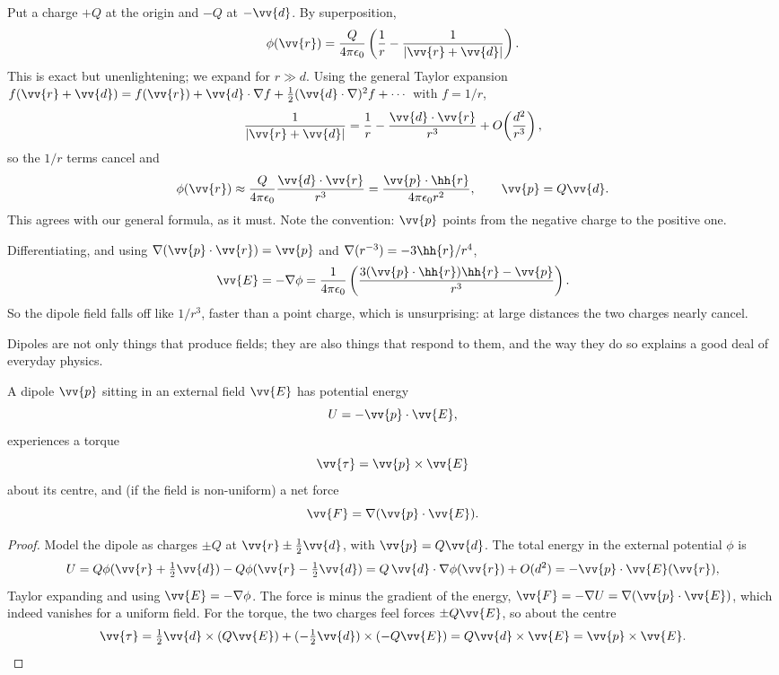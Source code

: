 \begin{example}
	Put a charge $+Q$ at the origin and $-Q$ at $-\vv{d}$. By superposition,
	$$
	\phi(\vv{r}) = \frac{Q}{4\pi\epsilon_0}\left(\frac{1}{r} - \frac{1}{|\vv{r}+\vv{d}|}\right).
	$$
	This is exact but unenlightening; we expand for $r \gg d$. Using the general Taylor expansion $f(\vv{r}+\vv{d}) = f(\vv{r}) + \vv{d}\cdot \nabla f + \tfrac{1}{2}(\vv{d}\cdot \nabla)^2 f + \cdots$ with $f = 1/r$,
	$$
	\frac{1}{|\vv{r}+\vv{d}|} = \frac{1}{r} - \frac{\vv{d}\cdot \vv{r}}{r^3} + O\!\left(\frac{d^2}{r^3}\right),
	$$
	so the $1/r$ terms cancel and
	$$
	\phi(\vv{r}) \approx \frac{Q}{4\pi\epsilon_0}\frac{\vv{d}\cdot \vv{r}}{r^3} = \frac{\vv{p}\cdot \hh{r}}{4\pi\epsilon_0 r^2}, \qquad \vv{p} = Q\vv{d}.
	$$
	This agrees with our general formula, as it must. Note the convention: $\vv{p}$ points from the negative charge to the positive one.

	Differentiating, and using $\nabla(\vv{p}\cdot \vv{r}) = \vv{p}$ and $\nabla(r^{-3}) = -3\hh{r}/r^4$,
	$$
	\vv{E} = -\nabla \phi = \frac{1}{4\pi \epsilon_0}\left(\frac{3(\vv{p}\cdot \hh{r})\hh{r} - \vv{p}}{r^3}\right).
	$$
	So the dipole field falls off like $1/r^3$, faster than a point charge, which is unsurprising: at large distances the two charges nearly cancel.
\end{example}

Dipoles are not only things that produce fields; they are also things that respond to them, and the way they do so explains a good deal of everyday physics.

\begin{proposition}
	\label{prop:dipole-external}
	A dipole $\vv{p}$ sitting in an external field $\vv{E}$ has potential energy
	$$
	U = -\vv{p}\cdot\vv{E},
	$$
	experiences a torque
	$$
	\vv{\tau} = \vv{p}\times \vv{E}
	$$
	about its centre, and (if the field is non-uniform) a net force
	$$
	\vv{F} = \nabla(\vv{p}\cdot\vv{E}).
	$$
\end{proposition}
\begin{proof}
	Model the dipole as charges $\pm Q$ at $\vv{r}\pm\tfrac12\vv{d}$, with $\vv{p} = Q\vv{d}$. The total energy in the external potential $\phi$ is
	$$
	U = Q\phi(\vv{r}+\tfrac12\vv{d}) - Q\phi(\vv{r}-\tfrac12\vv{d}) = Q\,\vv{d}\cdot\nabla\phi(\vv{r}) + O(d^2) = -\vv{p}\cdot\vv{E}(\vv{r}),
	$$
	Taylor expanding and using $\vv{E} = -\nabla\phi$. The force is minus the gradient of the energy, $\vv{F} = -\nabla U = \nabla(\vv{p}\cdot\vv{E})$, which indeed vanishes for a uniform field. For the torque, the two charges feel forces $\pm Q\vv{E}$, so about the centre
	$$
	\vv{\tau} = \tfrac12\vv{d}\times(Q\vv{E}) + (-\tfrac12\vv{d})\times(-Q\vv{E}) = Q\vv{d}\times\vv{E} = \vv{p}\times\vv{E}. \qedhere
	$$
\end{proof}

